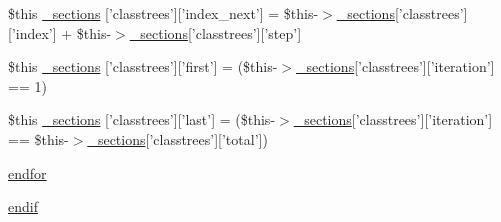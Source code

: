 \begin{DoxyCompactItemize}
\item 
\$this \hyperlink{_06_06202_05_06_062027336986_05classtrees_8tpl_8php_a149e248d29dda8de12c641fc17b5a4a6}{\-\_\-sections} \mbox{[}'classtrees'\mbox{]}\mbox{[}'index\-\_\-next'\mbox{]} = \$this-\/$>$\hyperlink{_06_06127_05_06_0612781687_05pkgelementindex_8tpl_8php_a9e3d26b39edfe29c3f29b8035ef33828}{\-\_\-sections}\mbox{[}'classtrees'\mbox{]}\mbox{[}'index'\mbox{]} + \$this-\/$>$\hyperlink{_06_06127_05_06_0612781687_05pkgelementindex_8tpl_8php_a9e3d26b39edfe29c3f29b8035ef33828}{\-\_\-sections}\mbox{[}'classtrees'\mbox{]}\mbox{[}'step'\mbox{]}
\item 
\$this \hyperlink{_06_06202_05_06_062027336986_05classtrees_8tpl_8php_ad5393dfe6ff4c414cb55fb70a983f388}{\-\_\-sections} \mbox{[}'classtrees'\mbox{]}\mbox{[}'first'\mbox{]} = (\$this-\/$>$\hyperlink{_06_06127_05_06_0612781687_05pkgelementindex_8tpl_8php_a9e3d26b39edfe29c3f29b8035ef33828}{\-\_\-sections}\mbox{[}'classtrees'\mbox{]}\mbox{[}'iteration'\mbox{]} == 1)
\item 
\$this \hyperlink{_06_06202_05_06_062027336986_05classtrees_8tpl_8php_aafcee1f4a5b3632d47ca4d3299625adc}{\-\_\-sections} \mbox{[}'classtrees'\mbox{]}\mbox{[}'last'\mbox{]} = (\$this-\/$>$\hyperlink{_06_06127_05_06_0612781687_05pkgelementindex_8tpl_8php_a9e3d26b39edfe29c3f29b8035ef33828}{\-\_\-sections}\mbox{[}'classtrees'\mbox{]}\mbox{[}'iteration'\mbox{]} == \$this-\/$>$\hyperlink{_06_06127_05_06_0612781687_05pkgelementindex_8tpl_8php_a9e3d26b39edfe29c3f29b8035ef33828}{\-\_\-sections}\mbox{[}'classtrees'\mbox{]}\mbox{[}'total'\mbox{]})
\item 
\hyperlink{_06_06202_05_06_062027336986_05classtrees_8tpl_8php_ae8fdc27183f296411bac00ed522ee1ac}{endfor}
\item 
\hyperlink{_06_06202_05_06_062027336986_05classtrees_8tpl_8php_a82cd33ca97ff99f2fcc5e9c81d65251b}{endif}
\end{DoxyCompactItemize}


